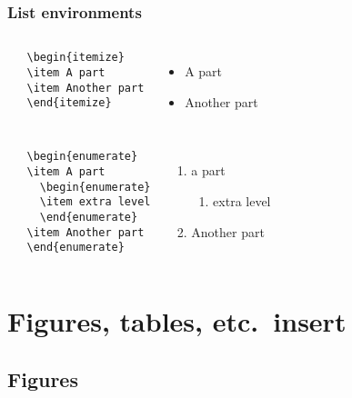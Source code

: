 \documentclass[aspectratio=169]{beamer}
\begin{document}
\begin{frame}[fragile]
 \frametitle{List environments}

 \begin{columns}[c]
   \begin{verbatim}
   \begin{itemize}
   \item A part
   \item Another part
   \end{itemize}
   \end{verbatim}

   \begin{itemize}
     \item A part
     \item Another part
   \end{itemize}
 \end{columns}

 \pause

 \begin{columns}[c]
   \begin{verbatim}
   \begin{enumerate}
   \item A part
     \begin{enumerate}
     \item extra level
     \end{enumerate}
   \item Another part
   \end{enumerate}
   \end{verbatim}

   \begin{enumerate}
     \item a part
     \begin{enumerate}
       \item extra level
     \end{enumerate}
     \item Another part
   \end{enumerate}
 \end{columns}

\end{frame}

\section{Figures, tables, etc.\ insert}

\subsection{Figures}
\end{document}
